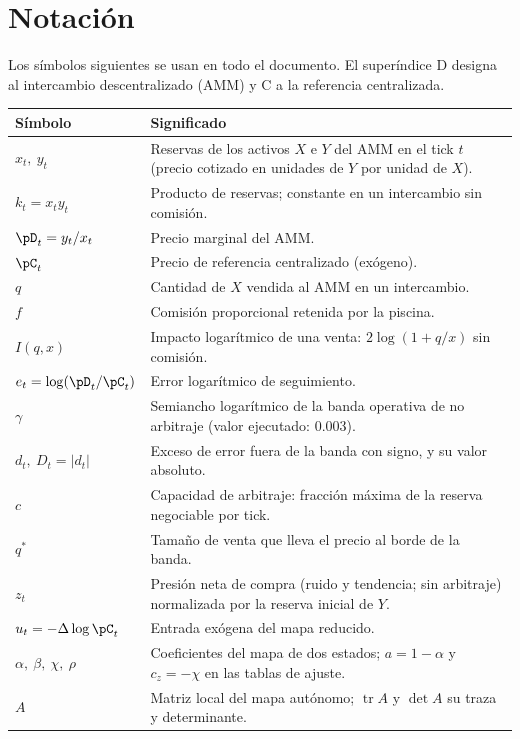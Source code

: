\chapter*{Notación}

Los símbolos siguientes se usan en todo el documento. El superíndice $\mathrm{D}$ designa al intercambio descentralizado (AMM) y $\mathrm{C}$ a la referencia centralizada.

\begin{center}
\small
\begin{tabularx}{\textwidth}{@{}l X@{}}
\toprule
Símbolo & Significado \\
\midrule
$x_t,\ y_t$ & Reservas de los activos $X$ e $Y$ del AMM en el tick $t$ (precio cotizado en unidades de $Y$ por unidad de $X$). \\
$k_t = x_t y_t$ & Producto de reservas; constante en un intercambio sin comisión. \\
$\pD_t = y_t/x_t$ & Precio marginal del AMM. \\
$\pC_t$ & Precio de referencia centralizado (exógeno). \\
$q$ & Cantidad de $X$ vendida al AMM en un intercambio. \\
$f$ & Comisión proporcional retenida por la piscina. \\
$I(q,x)$ & Impacto logarítmico de una venta: $2\log(1+q/x)$ sin comisión. \\
$e_t = \log(\pD_t/\pC_t)$ & Error logarítmico de seguimiento. \\
$\gamma$ & Semiancho logarítmico de la banda operativa de no arbitraje (valor ejecutado: $0.003$). \\
$d_t,\ D_t = |d_t|$ & Exceso de error fuera de la banda con signo, y su valor absoluto. \\
$c$ & Capacidad de arbitraje: fracción máxima de la reserva negociable por tick. \\
$q^{\ast}$ & Tamaño de venta que lleva el precio al borde de la banda. \\
$z_t$ & Presión neta de compra (ruido y tendencia; sin arbitraje) normalizada por la reserva inicial de $Y$. \\
$u_t = -\Delta\log \pC_t$ & Entrada exógena del mapa reducido. \\
$\alpha,\ \beta,\ \chi,\ \rho$ & Coeficientes del mapa de dos estados; $a = 1-\alpha$ y $c_z = -\chi$ en las tablas de ajuste. \\
$A$ & Matriz local del mapa autónomo; $\operatorname{tr}A$ y $\det A$ su traza y determinante. \\

\end{tabularx}
\end{center}
